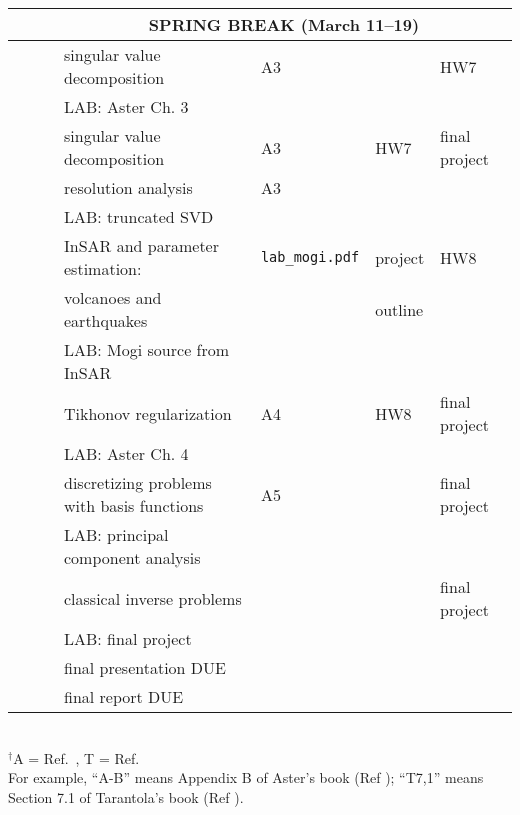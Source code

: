 \documentclass[10pt,titlepage,fleqn]{article}
\begin{document}
\begin{enumerate}
\begin{tabular}{cll|l|l|ll}
  &   &  & \multicolumn{4}{c}{SPRING BREAK (March 11--19)} \\
\hline\hline
&   &  & singular value decomposition & A3 & & HW7 \\
&   &  & LAB: Aster Ch. 3 & & & \\
\hline
&  &  & singular value decomposition & A3 & HW7 & final project \\
&  &  & resolution analysis & A3 & & \\
&  &  & LAB: truncated SVD & & & \\
\hline
&   & & InSAR and parameter estimation: & \verb+lab_mogi.pdf+ & project & HW8 \\
&   &  & \hspace{5pt} volcanoes and earthquakes   & & outline & \\
&   &  & LAB: Mogi source from InSAR & & & \\
\hline
&   & & Tikhonov regularization & A4 & HW8 & final project \\
&   &  & LAB: Aster Ch. 4 & & & \\
\hline
&  &  & discretizing problems with basis functions & A5 & & final project  \\
&  &  & LAB: principal component analysis & & & \\
\hline
&   &  & classical inverse problems & & & final project \\
&   &  & LAB: final project & & & \\
\hline
&   &   & final presentation DUE & & &  \\
&   &   & final report DUE & & & \\ \hline
\hline
\end{tabular} \\
$^\dagger$A = Ref.~\cite{AsterE2}, T = Ref.~\cite{Tarantola2005} \\
For example, ``A-B'' means Appendix B of Aster's book (Ref \cite{AsterE2}); ``T7,1'' means Section 7.1 of Tarantola's book (Ref \cite{Tarantola2005}).

\pagebreak
{}


\end{enumerate}
\end{document}
